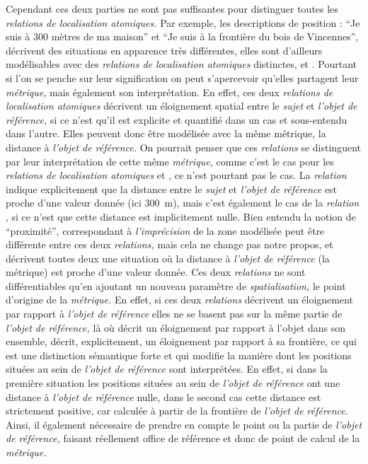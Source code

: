 Cependant ces deux parties ne sont pas suffisantes pour distinguer
toutes les \emph{relations de localisation atomiques.} Par exemple,
les descriptions de position : \enquote{Je suis à 300 mètres de ma
  maison} et \enquote{Je suis à la frontière du bois de Vincennes},
décrivent des situations en apparence très différentes, elles sont
d'ailleurs modélisables avec des \emph{relations de localisation
  atomiques} distinctes,  et
. Pourtant si l'on se penche sur leur
signification on peut s’apercevoir qu'elles partagent leur
\emph{métrique,} mais également son interprétation. En effet, ces deux
\emph{relations de localisation atomiques} décrivent un éloignement
spatial entre le \emph{sujet} et \emph{l'objet de référence,} si ce
n'est qu'il est explicite et quantifié dans un cas et sous-entendu
dans l'autre. Elles peuvent donc être modélisée avec la même métrique,
la distance à \emph{l'objet de référence.} On pourrait penser que ces
\emph{relations} se distinguent par leur interprétation de cette même
\emph{métrique,} comme c'est le cas pour les \emph{relations de
  localisation atomiques}  et
, ce n'est pourtant pas le cas. La
\emph{relation}  indique
explicitement que la distance entre le \emph{sujet} et \emph{l'objet
  de référence} est proche d'une valeur donnée (ici \SI{300}{\meter}),
mais c'est également le cas de la \emph{relation}
, si ce n'est que cette distance est
implicitement nulle. Bien entendu la notion de \enquote{proximité},
correspondant à \emph{l'imprécision} de la zone modélisée peut être
différente entre ces deux \emph{relations,} mais cela ne change pas
notre propos,  et
 décrivent toutes deux une situation
où la distance à \emph{l'objet de référence} (\ie la métrique) est
proche d'une valeur donnée. Ces deux \emph{relations} ne sont
différentiables qu'en ajoutant un nouveau paramètre de
\emph{spatialisation,} le point d'origine de la \emph{métrique.} En
effet, si ces deux \emph{relations} décrivent un éloignement par
rapport à \emph{l'objet de référence} elles ne se basent pas sur la
même partie de \emph{l'objet de référence,} là où
 décrit un éloignement par rapport à
l'objet dans son ensemble,  décrit,
explicitement, un éloignement par rapport à sa frontière, ce qui est
une distinction sémantique forte et qui modifie la manière dont les
positions situées au sein de \emph{l'objet de référence} sont
interprétées. En effet, si dans la première situation les positions
situées au sein de \emph{l'objet de référence} ont une distance à
\emph{l'objet de référence} nulle, dans le second cas cette distance
est strictement positive, car calculée à partir de la frontière de
\emph{l'objet de référence.} Ainsi, il également nécessaire de prendre
en compte le point ou la partie de \emph{l'objet de référence,}
faisant réellement office de référence et donc de point de calcul de
la \emph{métrique.}


